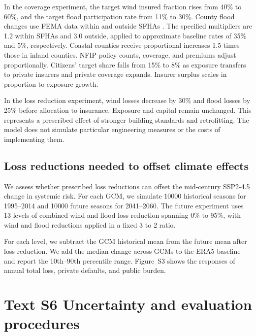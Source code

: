 In the coverage experiment, the target wind insured fraction rises from 40\% to 60\%, and the target flood participation rate from 11\% to 30\%. County flood changes use FEMA data within and outside SFHAs \cite{fema_nfip_penetration_2025}. The specified multipliers are 1.2 within SFHAs and 3.0 outside, applied to approximate baseline rates of 35\% and 5\%, respectively. Coastal counties receive proportional increases 1.5 times those in inland counties. NFIP policy counts, coverage, and premiums adjust proportionally. Citizens' target share falls from 15\% to 8\% as exposure transfers to private insurers and private coverage expands. Insurer surplus scales in proportion to exposure growth.

In the loss reduction experiment, wind losses decrease by 30\% and flood losses by 25\% before allocation to insurance. Exposure and capital remain unchanged. This represents a prescribed effect of stronger building standards and retrofitting. The model does not simulate particular engineering measures or the costs of implementing them.

\subsection*{Loss reductions needed to offset climate effects}\label{MethodsBuildingCodeClimate}
We assess whether prescribed loss reductions can offset the mid-century SSP2-4.5 change in systemic risk. For each GCM, we simulate \num{10000} historical seasons for 1995--2014 and \num{10000} future seasons for 2041--2060. The future experiment uses 13 levels of combined wind and flood loss reduction spanning 0\% to 95\%, with wind and flood reductions applied in a fixed 3 to 2 ratio.

For each level, we subtract the GCM historical mean from the future mean after loss reduction. We add the median change across GCMs to the ERA5 baseline and report the 10th--90th percentile range. Figure~S3 shows the responses of annual total loss, private defaults, and public burden.

\section*{Text S6 Uncertainty and evaluation procedures}\label{TextS6}
